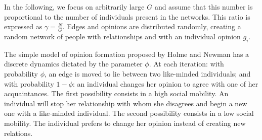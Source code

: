 \documentclass[11pt]{article}
\begin{document}
In the following, we focus on arbitrarily large $G$ and assume that this number is proportional to the number of individuals present in the networks. This ratio is expressed as $\gamma =  \frac{N}{G} $. Edges and opinions are distributed randomly, creating a random network of people with relationships and with an individual opinion $g_i$. 

The simple model of opinion formation proposed by Holme and Newman has a discrete dynamics dictated by the parameter $\phi$. At each iteration: with probability $\phi$,  an edge is moved to lie between two like-minded individuals; and with probability $1-\phi$: an individual changes her opinion to agree with one of her acquaintances. The first possibility consists in a high social mobility. An individual will stop her relationship with whom she disagrees and begin a new one with a like-minded individual. The second possibility consists in a low social mobility. The individual prefers to change her opinion instead of creating new relations.
\end{document}
